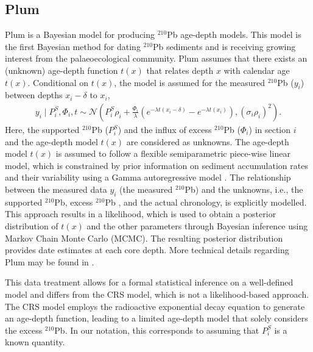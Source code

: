 \documentclass [10pt] {article}
\newcommand{\ac}{\color{red} }  %
\newcommand{\ca}{\color{black}} %
\begin{document}


\subsection{Plum}

Plum \citep{Aquino2018} is a Bayesian model for producing $^{210}$Pb age-depth models.
This model is the first Bayesian method for dating $^{210}$Pb sediments and is receiving growing interest from the palaeoecological community. %
Plum assumes that there exists an (unknown) age-depth function $t(x)$ that relates depth $x$ with calendar age $t(x)$. 
Conditional on $t(x)$, the model is assumed for the measured $^{210}$Pb ($y_i$) between depths $x_i - \delta$ to $x_i$,
\begin{eqnarray}
y_i \mid P^S_i, \Phi_i, t \sim \mathcal{N} \left(P^S_i \rho_i +\frac{\Phi_i}{\lambda} \left( e^{-\lambda t(x_i-\delta)} - e^{-\lambda t(x_i)} \right), (\sigma_i\rho_i)^2 \right). 
\end{eqnarray}
Here, the supported $^{210}$Pb ($P_i^S$) and the influx of excess $^{210}$Pb ($\Phi_i$) in section $i$  and the age-depth model $t(x)$ are considered as unknowns. The age-depth model $t(x)$ is assumed to follow a flexible semiparametric piece-wise linear model, which is constrained by prior information on sediment accumulation rates and their variability using a Gamma autoregressive model \citep{Blaauw2011}. The relationship between the measured data $y_i$ (the measured $^{210}$Pb) and the unknowns, i.e., the supported $^{210}$Pb, excess $^{210}$Pb %
, and the actual chronology, is explicitly modelled. This approach results in a likelihood, which is used to obtain a posterior distribution of $t(x)$ and the other parameters through Bayesian inference using Markov Chain Monte Carlo (MCMC). The resulting posterior distribution provides date estimates at each core depth. More technical details regarding Plum may be found in \citep{Aquino2018}.

This data treatment allows for a formal statistical inference on a well-defined model and differs from the CRS model, which is not a likelihood-based approach. The CRS model employs the radioactive exponential decay equation to generate an age-depth function, leading to a limited age-depth model that solely considers the excess $^{210}$Pb. In our notation, this corresponds to assuming that $P_i^S$ is a known quantity. 
\end{document}
